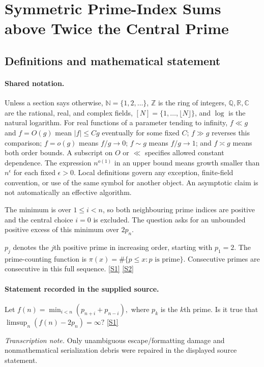\documentclass[11pt,a4paper]{article}
\newcommand{\N}{\mathbb{N}}
\newcommand{\Z}{\mathbb{Z}}
\newcommand{\Q}{\mathbb{Q}}
\newcommand{\R}{\mathbb{R}}
\newcommand{\C}{\mathbb{C}}
\newcommand{\sref}[2]{\hyperlink{source:#1:#2}{[S#2]}}
\begin{document}
\section{Symmetric Prime-Index Sums above Twice the Central Prime}\label{statement}


\subsection{Definitions and mathematical statement}

\paragraph{Shared notation.}Unless a section says otherwise, $\N=\{1,2,\ldots\}$,
$\Z$ is the ring of integers, $\Q,\R,\C$ are the rational, real, and complex
fields, $[N]=\{1,\ldots,\lfloor N\rfloor\}$, and $\log$ is the natural
logarithm. For real functions of a parameter tending to infinity,
$f\ll g$ and $f=O(g)$ mean $|f|\leq Cg$ eventually for some fixed $C$;
$f\gg g$ reverses this comparison; $f=o(g)$ means $f/g\to0$;
$f\sim g$ means $f/g\to1$; and $f\asymp g$ means both order bounds.
A subscript on $O$ or $\ll$ specifies allowed constant dependence.
The expression $n^{o(1)}$ in an upper bound means growth smaller than
$n^\epsilon$ for each fixed $\epsilon>0$. Local definitions govern any
exception, finite-field convention, or use of the same symbol for another
object. An asymptotic claim is not automatically an effective algorithm.



The minimum is over $1\leq i<n$, so both neighbouring prime indices are positive and the central choice $i=0$ is excluded. The question asks for an unbounded positive excess of this minimum over $2p_n$.

$p_j$ denotes the $j$th positive prime in increasing order, starting with $p_1=2$. The prime-counting function is $\pi(x)=\#\{p\leq x:p\text{ is prime}\}$. Consecutive primes are consecutive in this full sequence. \sref{statement}{1} \sref{statement}{2}

\paragraph{Statement recorded in the supplied source.}
Let $ f(n) = \min_{i<n} (p_{n+i}+p_{n-i}), $ where $p_k$ is the $k$th prime. Is it true that $ \limsup_n (f(n)-2p_n)=\infty? $ \sref{statement}{1}

{\small\emph{Transcription note.} Only unambiguous escape/formatting damage and nonmathematical serialization debris were repaired in the displayed source statement.}
\end{document}
